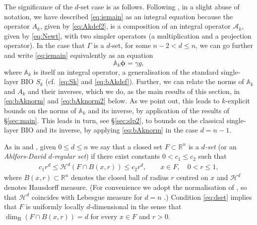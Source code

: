 \documentclass{birkjour}
\theoremstyle{definition}
\theoremstyle{remark}
\numberwithin{equation}{section}
\newcommand{\dimH}{\dim_{\mathrm{H}}}
\newcommand{\R}{\mathbb{R}}
\newcommand{\cA}{\mathcal{A}}
\newcommand{\cH}{\mathcal{H}}
\newcommand{\bA}{\mathbb{A}}
\newcommand{\bphi}{\boldsymbol{\phi}}
\begin{document}
The significance of the $d$-set case is as follows. Following \cite{caetano2025integral}, in a slight abuse of notation, we have described \eqref{eq:iemain} as an integral equation because the operator $A_k$, given by \eqref{eq:Akdef2}, is a composition of an integral operator $\cA_k$, given by \eqref{eq:Newt}, with two simpler operators (a multiplication and a projection operator). In the case that $\Gamma$ is a $d$-set, for some $n-2<d\leq n$, we can go further and write \eqref{eq:iemain} equivalently as an equation
\begin{equation} \label{eq:ie22}
\bA_k \bphi = \gamma g,
\end{equation}
where $\bA_k$ is itself an integral operator, a generalisation of the standard single-layer BIO $S_k$ (cf.~\eqref{eq:Sk} and \eqref{eq:bAkdef}). Further, we can relate the norms of $\bA_k$ and $A_k$ and their inverses, which we do, as the main results of this section, in \eqref{eq:bAknorm} and \eqref{eq:bAknorm2} below. As we point out, this leads to $k$-explicit bounds on the norms of $\bA_k$ and its inverse, by application of the results of \S\ref{sec:main}.  This leads in turn, see \S\ref{sec:slp2}, to bounds on the classical single-layer BIO and its inverse, by applying \eqref{eq:bAknorm} in the case $d=n-1$.


As in \cite[\S1.1]{JoWa84} and \cite[\S3]{Triebel97FracSpec}, given $0\leq d\leq n$ we say that a closed set $F\subset \R^n$ is a {\em$d$-set} (or an \textit{Ahlfors-David $d$-regular set}) if there exist constants $0<c_1\leq c_2$ such that
\begin{align}
\label{eq:dset}
c_{1}r^{d}\leq \cH^d(F\cap B(x,r))\leq c_{2}r^{d},\qquad x\in{F},\quad0<r\leq1,
\end{align}
where $B(x,r)\subset \R^n$ denotes the closed ball of radius $r$ centred on $x$ and $\cH^d$ denotes Hausdorff measure.  (For convenience we adopt the normalisation of \cite[Def. 2.1]{EvansGariepy}, so that
$\cH^d$ coincides with Lebesgue measure for $d = n$ \cite[Thm. 2.5]{EvansGariepy}.)
Condition \eqref{eq:dset} implies that $F$ is uniformly locally $d$-dimensional in the sense that $\dimH(F\cap B(x,r))=d$ for every $x\in {F}$ and $r>0$. 
\end{document}
